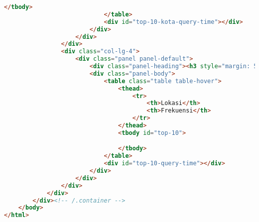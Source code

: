 \begin{lstlisting}[language=HTML,basicstyle=\tiny,caption=index.html]
                                </tbody>
                            </table>
                            <div id="top-10-kota-query-time"></div>
                        </div>
                    </div>
                </div>
                <div class="col-lg-4">
                    <div class="panel panel-default">
                        <div class="panel-heading"><h3 style="margin: 5px; font-size: 18px">Top 10 Lokasi Wisata</h3></div>
                        <div class="panel-body">
                            <table class="table table-hover">
                                <thead>
                                    <tr>
                                        <th>Lokasi</th>
                                        <th>Frekuensi</th>
                                    </tr>
                                </thead>
                                <tbody id="top-10">

                                </tbody>
                            </table>
                            <div id="top-10-query-time"></div>
                        </div>
                    </div>
                </div>
            </div>
        </div><!-- /.container -->
    </body>
</html>
\end{lstlisting}

